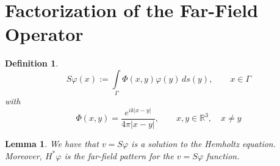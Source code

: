 \documentclass[]{article}
\newtheorem{definition}{Definition}
\newtheorem{lemma}{Lemma}
\newcommand{\R}{\mathbb R}
\begin{document}
		\section{Factorization of the Far-Field Operator}
			\begin{definition}
				\begin{equation}
					S\varphi(x) := \int\limits_\Gamma \Phi(x, y) \varphi(y)\, ds(y), \qquad x \in \Gamma
				\end{equation}
				with 
				\begin{equation}
					\Phi(x, y) = \frac{e^{ik|x-y|}}{4\pi|x-y|}, \qquad x, y \in \R^3, \quad x\neq y
				\end{equation}
			\end{definition}
			\begin{lemma}
				We have that $v= S\varphi$ is a solution to the Hemholtz equation. Moreover, $H^\ast \varphi$ is the far-field pattern for the $v = S\varphi$ function.
			\end{lemma}
\end{document}
